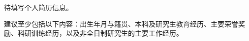 
\begin{resume}
待填写个人简历信息。

建议至少包括以下内容：出生年月与籍贯、本科及研究生教育经历、主要荣誉奖励、科研训练经历，以及非全日制研究生的主要工作经历。
\end{resume}
